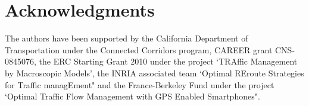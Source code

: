 \section{Acknowledgments}\label{sec:ack}

The authors have been supported by the California Department of Transportation
under the Connected Corridors program, CAREER grant CNS-0845076, the ERC
Starting Grant 2010 under the project `TRAffic Management by Macroscopic
Models', the INRIA associated team `Optimal REroute Strategies for Traffic
managEment" and the France-Berkeley Fund under the project `Optimal Traffic
Flow Management with GPS Enabled Smartphones".
